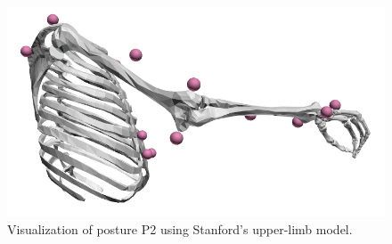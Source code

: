 \begin{figure}[!htb]
\begin{minipage}{0.3\linewidth}
        \centering
        \includegraphics[trim={0 0 0 0}, clip, width=0.9\linewidth]{img/chapter_5/posture2_sagittal.png}
    \end{minipage}
    \caption{Visualization of posture P2 using Stanford's upper-limb model.}
    \label{fig:exp_pose2}
\end{figure}


